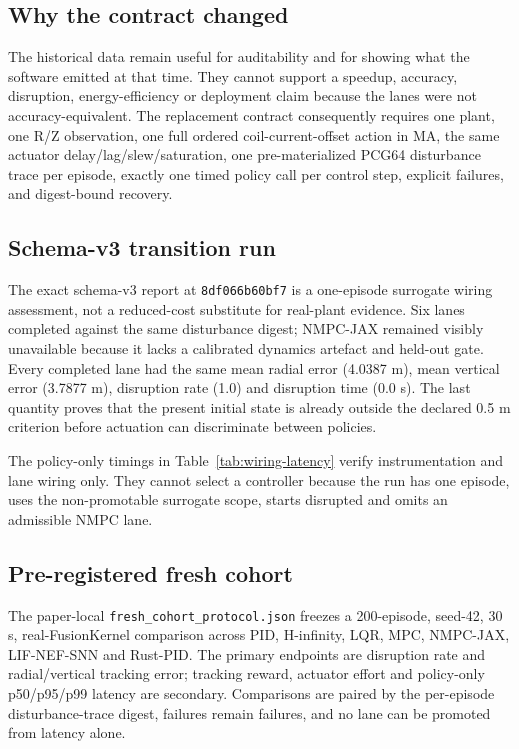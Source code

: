 \documentclass[11pt]{article}
\newcommand{\code}[1]{\texttt{#1}}
\begin{document}
\subsection{Why the contract changed}

The historical data remain useful for auditability and for showing what the
software emitted at that time.  They cannot support a speedup, accuracy,
disruption, energy-efficiency or deployment claim because the lanes were not
accuracy-equivalent.  The replacement contract consequently requires one plant,
one R/Z observation, one full ordered coil-current-offset action in MA, the same
actuator delay/lag/slew/saturation, one pre-materialized PCG64 disturbance trace
per episode, exactly one timed policy call per control step, explicit failures,
and digest-bound recovery.

\subsection{Schema-v3 transition run}

The exact schema-v3 report at \code{8df066b60bf7} is a one-episode surrogate
wiring assessment, not a reduced-cost substitute for real-plant evidence.  Six
lanes completed against the same disturbance digest; NMPC-JAX remained visibly
unavailable because it lacks a calibrated dynamics artefact and held-out gate.
Every completed lane had the same mean radial error (4.0387 m), mean vertical
error (3.7877 m), disruption rate (1.0) and disruption time (0.0 s).  The last
quantity proves that the present initial state is already outside the declared
0.5 m criterion before actuation can discriminate between policies.



The policy-only timings in Table~\ref{tab:wiring-latency} verify instrumentation
and lane wiring only.  They cannot select a controller because the run has one
episode, uses the non-promotable surrogate scope, starts disrupted and omits an
admissible NMPC lane.

\subsection{Pre-registered fresh cohort}

The paper-local \code{fresh\_cohort\_protocol.json} freezes a 200-episode,
seed-42, 30 s, real-FusionKernel comparison across PID, H-infinity, LQR, MPC,
NMPC-JAX, LIF-NEF-SNN and Rust-PID.  The primary endpoints are disruption rate
and radial/vertical tracking error; tracking reward, actuator effort and
policy-only p50/p95/p99 latency are secondary.  Comparisons are paired by the
per-episode disturbance-trace digest, failures remain failures, and no lane can
be promoted from latency alone.
\end{document}
